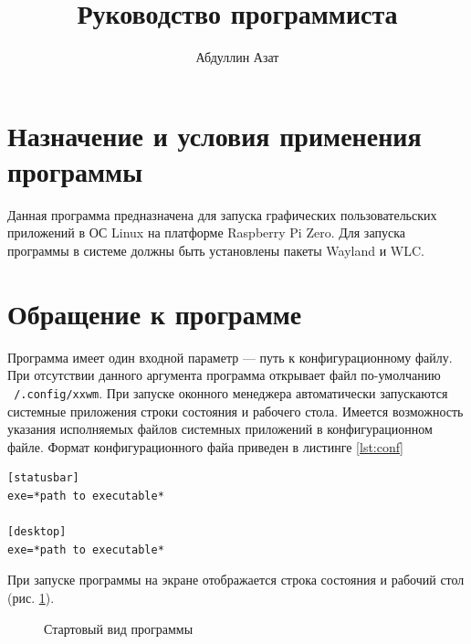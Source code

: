 \documentclass[10pt,a4paper]{report}
\author{Абдуллин Азат}
\title{Руководство программиста}
\begin{document}
\maketitle
\renewcommand{\thesection}{\arabic{section}}
\tableofcontents
\pagebreak
	
\section{Назначение и условия применения программы}
Данная программа предназначена для запуска графических пользовательских приложений 	в ОС Linux на платформе Raspberry Pi Zero. Для запуска программы в системе должны быть установлены пакеты Wayland и WLC.
		
\section{Обращение к программе}
Программа имеет один входной параметр --- путь к конфигурационному файлу. При отсутствии данного аргумента программа открывает файл по-умолчанию \texttt{~/.config/xxwm}. При запуске оконного менеджера автоматически запускаются системные приложения строки состояния и рабочего стола. Имеется возможность указания исполняемых файлов системных приложений в конфигурационном файле. Формат конфигурационного файа приведен в листинге \ref{lst:conf}
\begin{lstlisting}[label=lst:conf, caption={Формат конфигурационного файла}]
[statusbar]
exe=*path to executable*

[desktop]
exe=*path to executable*
\end{lstlisting}

При запуске программы на экране отображается строка состояния и рабочий стол (рис. \ref{fig:wm1}).
\begin{figure}[h!]
\caption{Стартовый вид программы}
\label{fig:wm1}
\end{figure}
\end{document}
